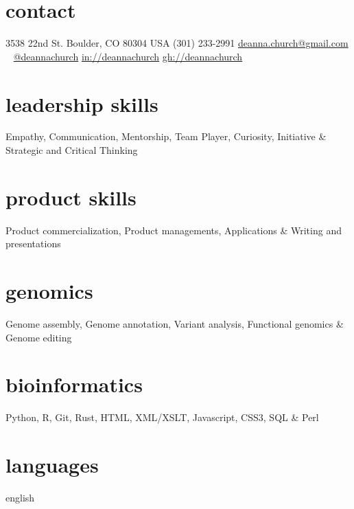 \documentclass[]{dmc-cv} %
\begin{document}


\begin{aside} %
\section{contact}
3538 22nd St.
Boulder, CO 80304
USA
{\Large\textcolor{gray}{\Mobilefone}} \hfill (301) 233-2991
\href{mailto:deanna.church@gmail.com}{deanna.church@gmail.com}
~
\tlogo \hfill \href{http://twitter.com/deannachurch}{@deannachurch}
\llogo \hfill \href{https://www.linkedin.com/in/deanna-church-a8749513/}{in://deannachurch}
\ghlogo \hfill \href{https://www.github.com/deannachurch}{gh://deannachurch}
~
\section{leadership skills}
Empathy, Communication, 
Mentorship, Team Player,
Curiosity, Initiative \&
Strategic and 
Critical Thinking

\section{product skills}
Product commercialization, 
Product managements,
Applications \& 
Writing and presentations

\section{genomics}
Genome assembly,
Genome annotation,
Variant analysis,
Functional genomics \& 
Genome editing

\section{bioinformatics}
Python, R, Git, Rust,
HTML, XML/XSLT, Javascript,
CSS3, SQL \& Perl

\section{languages}
english
\end{aside}
\end{document}
